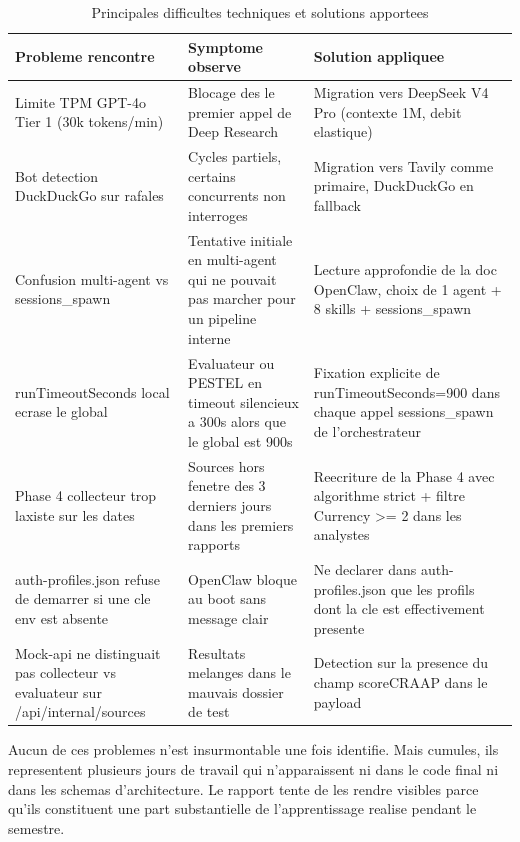 \documentclass[12pt,a4paper,openany]{report}
\begin{document}
\begin{table}[H]
  \centering
  \caption{Principales difficultes techniques et solutions apportees}
  \label{tab:difficultes}
  \small
  \begin{tabularx}{\linewidth}{YYY}
    \toprule
    \textbf{Probleme rencontre} & \textbf{Symptome observe} & \textbf{Solution appliquee} \\
    \midrule
    Limite TPM GPT-4o Tier 1 (30k tokens/min) & Blocage des le premier appel de Deep Research & Migration vers DeepSeek V4 Pro (contexte 1M, debit elastique) \\
    Bot detection DuckDuckGo sur rafales & Cycles partiels, certains concurrents non interroges & Migration vers Tavily comme primaire, DuckDuckGo en fallback \\
    Confusion multi-agent vs sessions\_spawn & Tentative initiale en multi-agent qui ne pouvait pas marcher pour un pipeline interne & Lecture approfondie de la doc OpenClaw, choix de 1 agent + 8 skills + sessions\_spawn \\
    runTimeoutSeconds local ecrase le global & Evaluateur ou PESTEL en timeout silencieux a 300s alors que le global est 900s & Fixation explicite de runTimeoutSeconds=900 dans chaque appel sessions\_spawn de l'orchestrateur \\
    Phase 4 collecteur trop laxiste sur les dates & Sources hors fenetre des 3 derniers jours dans les premiers rapports & Reecriture de la Phase 4 avec algorithme strict + filtre Currency >= 2 dans les analystes \\
    auth-profiles.json refuse de demarrer si une cle env est absente & OpenClaw bloque au boot sans message clair & Ne declarer dans auth-profiles.json que les profils dont la cle est effectivement presente \\
    Mock-api ne distinguait pas collecteur vs evaluateur sur /api/internal/sources & Resultats melanges dans le mauvais dossier de test & Detection sur la presence du champ scoreCRAAP dans le payload \\
    \bottomrule
  \end{tabularx}
\end{table}

Aucun de ces problemes n'est insurmontable une fois identifie. Mais cumules, ils representent plusieurs jours de travail qui n'apparaissent ni dans le code final ni dans les schemas d'architecture. Le rapport tente de les rendre visibles parce qu'ils constituent une part substantielle de l'apprentissage realise pendant le semestre.
\end{document}
